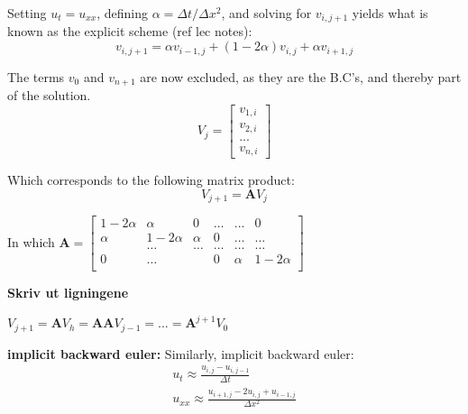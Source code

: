 \documentclass[%
oneside,                 %
final,                   %
10pt]{article}
\begin{document}
Setting $u_t=u_{xx}$, defining $\alpha = \Delta t/\Delta x^2$, and solving for $v_{i,j+1}$ yields what is known as the explicit scheme (ref lec notes): 
\begin{equation}
v_{i,j+1}=\alpha v_{i-1,j}+(1-2 \alpha)v_{i,j}+\alpha v_{i+1,j}
\end{equation}



The terms $v_0$ and $v_{n+1}$ are now excluded, as they are the B.C's, and thereby part of the solution. 
\begin{equation} V_j=
\begin{bmatrix}
v_{1,i} \\ v_{2,i} \\ ...\\ v_{n,i}
\end{bmatrix}
\end{equation}


Which corresponds to the following matrix product:
\begin{equation}
V_{j+1}=\mathbf{A}V_j
\end{equation}

In which $\textbf{A}=  \begin{bmatrix}
                           1-2\alpha & \alpha & 0 &\dots   & \dots &0 \\
                           \alpha & 1-2\alpha  &  \alpha &0 &\dots &\dots \\
                           & \dots   & \dots &\dots   &\dots & \dots \\
                      
                           0&\dots    &  & 0  &\alpha & 1-2\alpha \\
              			\end{bmatrix}$ \newline
              			
\textbf{Skriv ut ligningene} \newline

$V_{j+1}=\mathbf{A}V_h=\mathbf{A}\mathbf{A}V_{j-1}=...=\mathbf{A}^{j+1}V_0$ \newline


\textbf{implicit backward euler:}
Similarly, implicit backward euler:
\begin{align}
u_t \approx \frac{u_{i,j} -u_{i,j-1}}{\Delta t} \\
u_{xx} \approx \frac{u_{i+1,j} -2u_{i,j}+u_{i-1,j}}{\Delta x^2}\\
\end{align}
\end{document}
